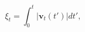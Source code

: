 \begin{equation}
\xi_t = \int_{0}^{t}{|\mathbf{v}_t(\mathit{t'})|\mathit{dt'}} ,
 \label{eq:xit}
\end{equation}
